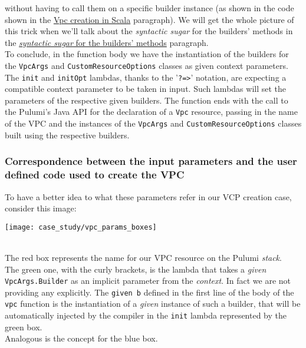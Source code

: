 without having to call them on a specific builder instance (as shown in the code shown in the \hyperref[sssec:vpc-creation-scala]{Vpc creation in Scala} paragraph).
We will get the whole picture of this trick when we'll talk about the \textit{syntactic sugar} for the builders' methods in the \hyperref[ssec:syn-sug-builders]{\textit{syntactic sugar} for the builders' methods} paragraph.\\
To conclude, in the function body we have the instantiation of the builders for the \texttt{VpcArgs} and \texttt{CustomResourceOptions} classes as given context parameters.
The \texttt{init} and \texttt{initOpt} lambdas, thanks to the '\texttt{?=>}' notation, are expecting a compatible context parameter to be taken in input.
Such lambdas will set the parameters of the respective given builders.
The function ends with the call to the Pulumi's Java API for the declaration of a \texttt{Vpc} resource, passing in the name of the VPC and the instances of the \texttt{VpcArgs} and \texttt{CustomResourceOptions} classes built using the respective builders.

\subsubsection{Correspondence between the input parameters and the user defined code used to create the VPC}
To have a better idea to what these parameters refer in our VCP creation case, consider this image:
\begin{center}
  \hspace*{-1cm}\texttt{[image: case\_study/vpc\_params\_boxes]} 
\end{center}\mbox{}\\
The red box represents the name for our VPC resource on the Pulumi \textit{stack}.\\
The green one, with the curly brackets, is the lambda that takes a \textit{given} \texttt{VpcArgs.Builder} as an implicit parameter from the \textit{context}.
In fact we are not providing any explicitly.
The \texttt{given b} defined in the first line of the body of the \texttt{vpc} function is the instantiation of a \textit{given} instance of such a builder, that will be automatically injected by the compiler in the \texttt{init} lambda represented by the green box.\\
Analogous is the concept for the blue box.\\

